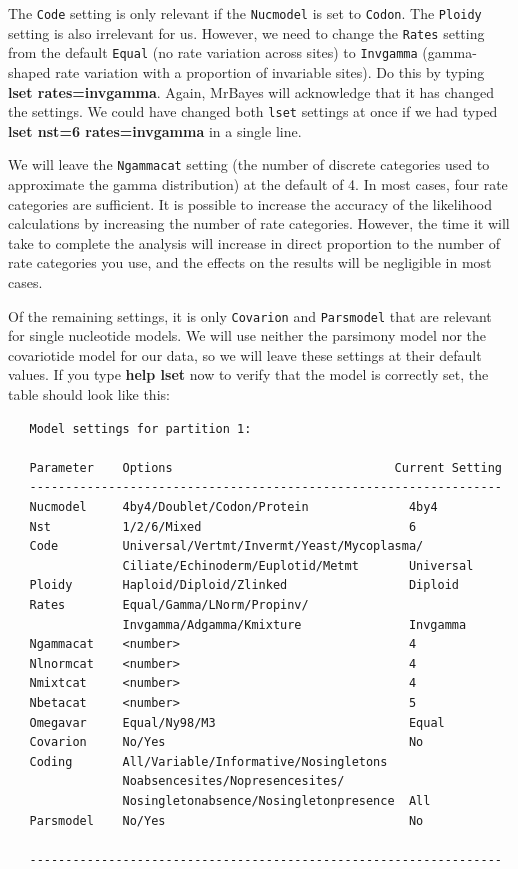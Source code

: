 \documentclass[12pt]{book}
\begin{document}
The \texttt{Code} setting is only relevant if the \texttt{Nucmodel} is set to \texttt{Codon}.  The
\texttt{Ploidy} setting is also irrelevant for us. However, we need to change the \texttt{Rates}
setting from the default \texttt{Equal} (no rate variation across sites) to \texttt{Invgamma}
(gamma-shaped rate variation with a proportion of invariable sites). Do this by typing \textbf{lset
rates=invgamma}. Again, MrBayes will acknowledge that it has changed the settings. We could have
changed both \texttt{lset} settings at once if we had typed \textbf{lset nst=6 rates=invgamma} in a
single line.

We will leave the \texttt{Ngammacat} setting (the number of discrete categories used to approximate
the gamma distribution) at the default of 4. In most cases, four rate categories are sufficient. It
is possible to increase the accuracy of the likelihood calculations by increasing the number of
rate categories. However, the time it will take to complete the analysis will increase in direct
proportion to the number of rate categories you use, and the effects on the results will be
negligible in most cases.

Of the remaining settings, it is only \texttt{Covarion} and \texttt{Parsmodel} that are relevant
for single nucleotide models. We will use neither the parsimony model nor the covariotide model for
our data, so we will leave these settings at their default values. If you type \textbf{help lset}
now to verify that the model is correctly set, the table should look like this:

\begin{singlespacing}
\small
\begin{verbatim}
   Model settings for partition 1:

   Parameter    Options                               Current Setting
   ------------------------------------------------------------------
   Nucmodel     4by4/Doublet/Codon/Protein              4by4
   Nst          1/2/6/Mixed                             6
   Code         Universal/Vertmt/Invermt/Yeast/Mycoplasma/
                Ciliate/Echinoderm/Euplotid/Metmt       Universal
   Ploidy       Haploid/Diploid/Zlinked                 Diploid
   Rates        Equal/Gamma/LNorm/Propinv/
                Invgamma/Adgamma/Kmixture               Invgamma
   Ngammacat    <number>                                4
   Nlnormcat    <number>                                4
   Nmixtcat     <number>                                4
   Nbetacat     <number>                                5
   Omegavar     Equal/Ny98/M3                           Equal
   Covarion     No/Yes                                  No
   Coding       All/Variable/Informative/Nosingletons
                Noabsencesites/Nopresencesites/
                Nosingletonabsence/Nosingletonpresence  All
   Parsmodel    No/Yes                                  No

   ------------------------------------------------------------------
\end{verbatim}
\normalsize
\end{singlespacing}
\end{document}
